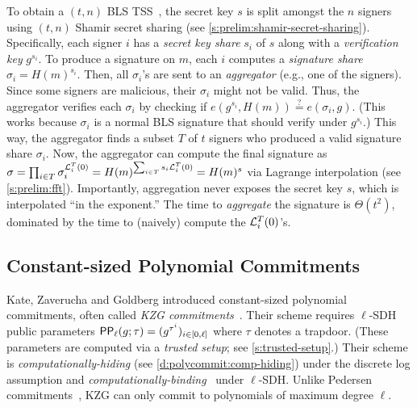 To obtain a $(t,n)$ BLS TSS~\cite{Boldyreva2003Threshold}, the secret key $s$ is split amongst the $n$ signers using $(t,n)$ Shamir secret sharing (see \cref{s:prelim:shamir-secret-sharing}).
Specifically, each signer $i$ has a \textit{secret key share} $s_i$ of $s$ along with a \textit{verification key} $g^{s_i}$.
To produce a signature on $m$, each $i$ computes a \textit{signature share} $\sigma_i = H(m)^{s_i}$.
Then, all $\sigma_i$'s are sent to an \textit{aggregator} (e.g., one of the signers).
Since some signers are malicious, their $\sigma_i$ might not be valid.
Thus, the aggregator verifies each $\sigma_i$ by checking if $e(g^{s_i}, H(m)) \stackrel{?}{=} e(\sigma_i, g)$.
(This works because $\sigma_i$ is a normal BLS signature that should verify under $g^{s_i}$.)
This way, the aggregator finds a subset $T$ of $t$ signers who produced a valid signature share $\sigma_i$.
Now, the aggregator can compute the final signature as $\sigma = \prod_{i\in T} {\sigma_i^{\mathcal{L}_i^T(0)}} = H(m)^{\sum_{i\in T} {s_i \mathcal{L}_i^T(0)}} = H(m)^s$ via Lagrange interpolation (see \cref{s:prelim:fft}).
Importantly, aggregation never exposes the secret key $s$, which is interpolated ``in the exponent.''
The time to \textit{aggregate} the signature is $\Theta(t^2)$, dominated by the time to (naively) compute the $\mathcal{L}_i^T(0)$'s.

\subsection{Constant-sized Polynomial Commitments}
\label{s:prelim:polycommit}
Kate, Zaverucha and Goldberg introduced constant-sized polynomial commitments, often called \textit{KZG commitments}~\cite{polycommit}.
Their scheme requires $\ell$-SDH~\cite{BonehBoyen2008} public parameters $\mathsf{PP}_\ell(g;\tau)=(g^{\tau^i})_{i\in[0,\ell]}$ where $\tau$ denotes a trapdoor.
(These parameters are computed via a \textit{trusted setup}; see \cref{s:trusted-setup}.)
Their scheme is \textit{computationally-hiding} (see \cref{d:polycommit:comp-hiding}) under the discrete log assumption and \textit{computationally-binding}~\cite{polycommit} under $\ell$-SDH.
Unlike Pedersen commitments~\cite{Pedersen1991Noninteractive}, KZG can only commit to polynomials of maximum degree $\ell$.

